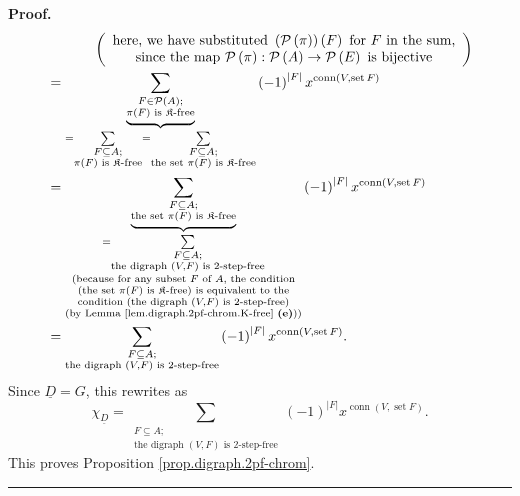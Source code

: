 \documentclass[numbers=enddot,12pt,final,onecolumn,notitlepage]{scrartcl}%
\theoremstyle{definition}
\newenvironment{proof}[1][Proof]{\noindent\textbf{#1.} }{\ \rule{0.5em}{0.5em}}
\newenvironment{verlong}{}{}
\let\sumnonlimits\sum
\renewcommand{\sum}{\sumnonlimits\limits}
\begin{document}
\begin{verlong}
\begin{proof}
\begin{align*}
&  \ \ \ \ \ \ \ \ \ \ \left(
\begin{array}
[c]{c}%
\text{here, we have substituted }\left(  \mathcal{P}\left(  \pi\right)
\right)  \left(  F\right)  \text{ for }F\text{ in the sum,}\\
\text{since the map }\mathcal{P}\left(  \pi\right)  :\mathcal{P}\left(
A\right)  \rightarrow\mathcal{P}\left(  E\right)  \text{ is bijective}%
\end{array}
\right) \\
&  =\underbrace{\sum_{\substack{F\in\mathcal{P}\left(  A\right)  ;\\\pi\left(
F\right)  \text{ is }\mathfrak{K}\text{-free}}}}_{=\sum_{\substack{F\subseteq
A;\\\pi\left(  F\right)  \text{ is }\mathfrak{K}\text{-free}}}=\sum
_{\substack{F\subseteq A;\\\text{the set }\pi\left(  F\right)  \text{ is
}\mathfrak{K}\text{-free}}}}\left(  -1\right)  ^{\left\vert F\right\vert
}x^{\operatorname*{conn}\left(  V,\operatorname*{set}F\right)  }\\
&  =\underbrace{\sum_{\substack{F\subseteq A;\\\text{the set }\pi\left(
F\right)  \text{ is }\mathfrak{K}\text{-free}}}}_{\substack{=\sum
_{\substack{F\subseteq A;\\\text{the digraph }\left(  V,F\right)  \text{ is
}2\text{-step-free}}}\\\text{(because for any subset }F\text{ of }A\text{, the
condition}\\\left(  \text{the set }\pi\left(  F\right)  \text{ is
}\mathfrak{K}\text{-free}\right)  \text{ is equivalent to the}%
\\\text{condition }\left(  \text{the digraph }\left(  V,F\right)  \text{ is
}2\text{-step-free}\right)  \\\text{(by Lemma
\ref{lem.digraph.2pf-chrom.K-free} \textbf{(e)}))}}}\left(  -1\right)
^{\left\vert F\right\vert }x^{\operatorname*{conn}\left(
V,\operatorname*{set}F\right)  }\\
&  =\sum_{\substack{F\subseteq A;\\\text{the digraph }\left(  V,F\right)
\text{ is }2\text{-step-free}}}\left(  -1\right)  ^{\left\vert F\right\vert
}x^{\operatorname*{conn}\left(  V,\operatorname*{set}F\right)  }.
\end{align*}
Since $\underline{D}=G$, this rewrites as
\[
\chi_{\underline{D}}=\sum_{\substack{F\subseteq A;\\\text{the digraph }\left(
V,F\right)  \text{ is }2\text{-step-free}}}\left(  -1\right)  ^{\left\vert
F\right\vert }x^{\operatorname*{conn}\left(  V,\operatorname*{set}F\right)
}.
\]
This proves Proposition \ref{prop.digraph.2pf-chrom}.
\end{proof}
\end{verlong}
\end{document}
